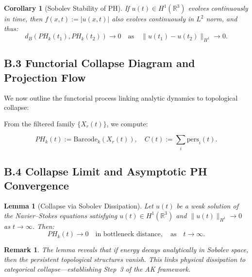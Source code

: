 \documentclass[11pt]{article}
\newtheorem{remark}[theorem]{Remark}
\newtheorem{lemma}[theorem]{Lemma}
\newtheorem{corollary}[theorem]{Corollary}
\begin{document}
\begin{corollary}[Sobolev Stability of PH]
If $u(t) \in H^1(\mathbb{R}^3)$ evolves continuously in time, then $f(x,t) := |u(x,t)|$ also evolves continuously in $L^2$ norm, and thus:
\[
d_B(PH_k(t_1), PH_k(t_2)) \to 0 \quad \text{as} \quad \|u(t_1) - u(t_2)\|_{H^1} \to 0.
\]
\end{corollary}

\subsection*{B.3 Functorial Collapse Diagram and Projection Flow}

We now outline the functorial process linking analytic dynamics to topological collapse:

\begin{center}
\end{center}

From the filtered family $\{X_r(t)\}$, we compute:

\[
PH_k(t) := \mathrm{Barcode}_k(X_r(t)),
\quad C(t) := \sum_i \text{pers}_i(t).
\]

\subsection*{B.4 Collapse Limit and Asymptotic PH Convergence}

\begin{lemma}[Collapse via Sobolev Dissipation]
Let $u(t)$ be a weak solution of the Navier–Stokes equations satisfying $u(t) \in H^1(\mathbb{R}^3)$ and $\|u(t)\|_{H^1} \to 0$ as $t \to \infty$. Then:
\[
PH_k(t) \to 0 \quad \text{in bottleneck distance}, \quad \text{as} \quad t \to \infty.
\]
\end{lemma}

\begin{remark}
The lemma reveals that if energy decays analytically in Sobolev space, then the persistent topological structures vanish. This links physical dissipation to categorical collapse—establishing Step~3 of the AK framework.
\end{remark}
\end{document}
